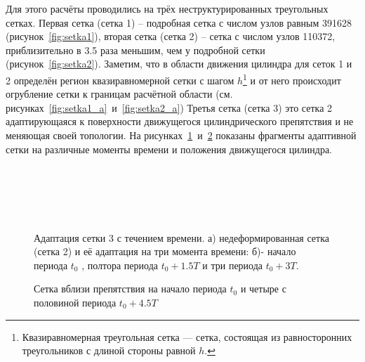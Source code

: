 Для этого расчёты проводились на трёх неструктурированных треугольных сетках. Первая сетка (сетка 1) – подробная сетка с числом узлов равным 391628 (рисунок~\ref{fig:setka1}), вторая сетка (сетка 2) – сетка с числом узлов 110372, приблизительно в 3.5 раза меньшим, чем у подробной сетки (рисунок~\ref{fig:setka2}).  Заметим, что в области движения цилиндра для сеток 1 и 2 определён регион квазиравномерной сетки с шагом $h$\footnote{ Квазиравномерная треугольная сетка — сетка, состоящая из равносторонних треугольников с длиной стороны равной $h$.} и от него происходит огрубление сетки к границам расчётной области (см. рисунках~\ref{fig:setka1_a}~и~\ref{fig:setka2_a})
Третья сетка (сетка 3) это сетка 2 адаптирующаяся к поверхности движущегося цилиндрического препятствия и не меняющая своей топологии. На рисунках~\ref{fig:setka3_mov}~и~\ref{fig:setka3_zoom} показаны фрагменты адаптивной сетки на различные моменты времени и положения движущегося цилиндра.
\begin{figure}
	{\centering
		\\
		\\
		\\
		\\
	}
	\caption[Адаптация сетки 3 с течением времени]{Адаптация сетки 3 с течением времени. а) недеформированная сетка (сетка 2) и её адаптация на три момента времени: б)- начало периода $t_0$ , полтора периода $t_0+1.5T$ и три периода $t_0+3T$.}
	\label{fig:setka3_mov}
\end{figure}
\begin{figure}
	\begin{minipage}{0.45\linewidth}
	\end{minipage}
	\hfill
	\begin{minipage}{0.45\linewidth}
	\end{minipage} 
	\vspace{10 pt}
	\caption{Сетка вблизи препятствия на начало периода $t_0$ и четыре с половиной периода $t_0+4.5T$ }
	\label{fig:setka3_zoom}
\end{figure}

